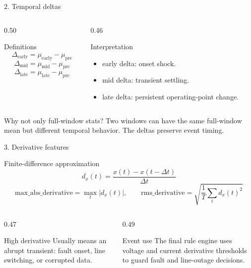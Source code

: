 \documentclass[10pt,aspectratio=169]{beamer}
\begin{document}
\begin{frame}{2. Temporal deltas}
\small
\begin{columns}[T,totalwidth=\textwidth]
\begin{column}{0.50\textwidth}
\begin{block}{Definitions}
\[
\Delta_{\mathrm{early}}=\mu_{\mathrm{early}}-\mu_{\mathrm{pre}}
\]
\[
\Delta_{\mathrm{mid}}=\mu_{\mathrm{mid}}-\mu_{\mathrm{pre}}
\]
\[
\Delta_{\mathrm{late}}=\mu_{\mathrm{late}}-\mu_{\mathrm{pre}}
\]
\end{block}
\end{column}
\begin{column}{0.46\textwidth}
\begin{exampleblock}{Interpretation}
\begin{itemize}
  \item early delta: onset shock.
  \item mid delta: transient settling.
  \item late delta: persistent operating-point change.
\end{itemize}
\end{exampleblock}
\end{column}
\end{columns}
\vspace{2mm}
\begin{alertblock}{Why not only full-window stats?}
Two windows can have the same full-window mean but different temporal behavior. The deltas preserve event timing.
\end{alertblock}
\end{frame}

\begin{frame}{3. Derivative features}
\small
\begin{block}{Finite-difference approximation}
\[
d_x(t) = \frac{x(t)-x(t-\Delta t)}{\Delta t}
\]
\[
\mathrm{max\_abs\_derivative}=\max_t |d_x(t)|,\qquad
\mathrm{rms\_derivative}=\sqrt{\frac{1}{T}\sum_t d_x(t)^2}
\]
\end{block}
\begin{columns}[T,totalwidth=\textwidth]
\begin{column}{0.47\textwidth}
\begin{exampleblock}{High derivative}
Usually means an abrupt transient: fault onset, line switching, or corrupted data.
\end{exampleblock}
\end{column}
\begin{column}{0.49\textwidth}
\begin{alertblock}{Event use}
The final rule engine uses voltage and current derivative thresholds to guard fault and line-outage decisions.
\end{alertblock}
\end{column}
\end{columns}
\end{frame}
\end{document}
